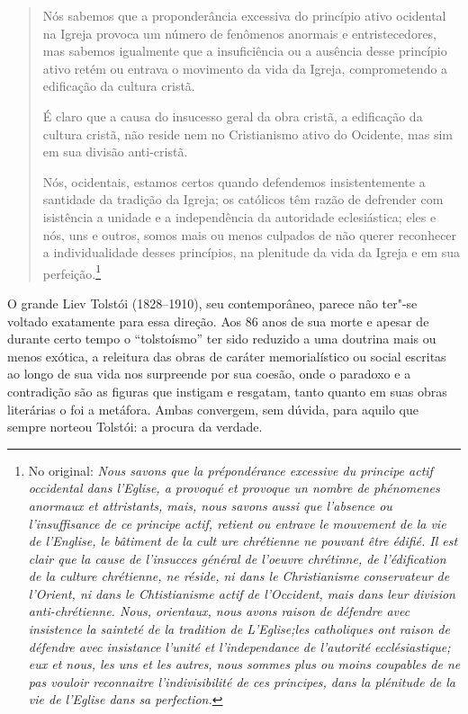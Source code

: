 \begin{quote}
Nós sabemos que a proponderância excessiva do princípio ativo ocidental
na Igreja provoca um número de fenômenos anormais e entristecedores, mas
sabemos igualmente que a insuficiência ou a ausência desse princípio
ativo retém ou entrava o movimento da vida da Igreja, comprometendo a
edificação da cultura cristã.

É claro que a causa do insucesso geral da obra cristã, a edificação da
cultura cristã, não reside nem no Cristianismo ativo do Ocidente, mas
sim em sua divisão anti-cristã.

Nós, ocidentais, estamos certos quando defendemos insistentemente a
santidade da tradição da Igreja; os católicos têm razão de defrender com
isistência a unidade e a independência da autoridade eclesiástica; eles
e nós, uns e outros, somos mais ou menos culpados de não querer
reconhecer a individualidade desses princípios, na plenitude da vida da
Igreja e em sua perfeição.\footnote{No original: \emph{Nous savons que la
  prépondérance excessive du principe actif occidental dans l'Eglise, a
  provoqué et provoque un nombre de phénomenes anormaux et attristants,
  mais, nous savons aussi que l'absence ou l'insuffisance de ce principe
  actif, retient ou entrave le mouvement de la vie de l'Englise, le
  bâtiment de la cult ure chrétienne ne pouvant être édifié. Il est
  clair que la cause de l'insucces général de l'oeuvre chrétinne, de
  l'édification de la culture chrétienne, ne réside, ni dans le
  Christianisme conservateur de l'Orient, ni dans le Chtistianisme actif
  de l'Occident, mais dans leur division anti-chrétienne. Nous,
  orientaux, nous avons raison de défendre avec insistence la sainteté
  de la tradition de L'Eglise;les catholiques ont raison de défendre
  avec insistance l'unité et l'independance de l'autorité
  ecclésiastique; eux et nous, les uns et les autres, nous sommes plus
  ou moins coupables de ne pas vouloir reconnaitre l'indivisibilité de
  ces principes, dans la plénitude de la vie de l'Eglise dans sa
  perfection.}}
\end{quote}

O grande Liev Tolstói (1828--1910), seu contemporâneo, parece não
ter"-se voltado exatamente para essa direção. Aos 86 anos de sua
morte e apesar de durante certo tempo o ``tolstoísmo'' ter
sido reduzido a uma doutrina mais ou menos exótica, a releitura das
obras de caráter memorialístico ou social escritas ao longo de sua vida
nos surpreende por sua coesão, onde o paradoxo e a contradição são as
figuras que instigam e resgatam, tanto quanto em suas obras literárias o
foi a metáfora. Ambas convergem, sem dúvida, para aquilo que sempre
norteou Tolstói: a procura da verdade.


